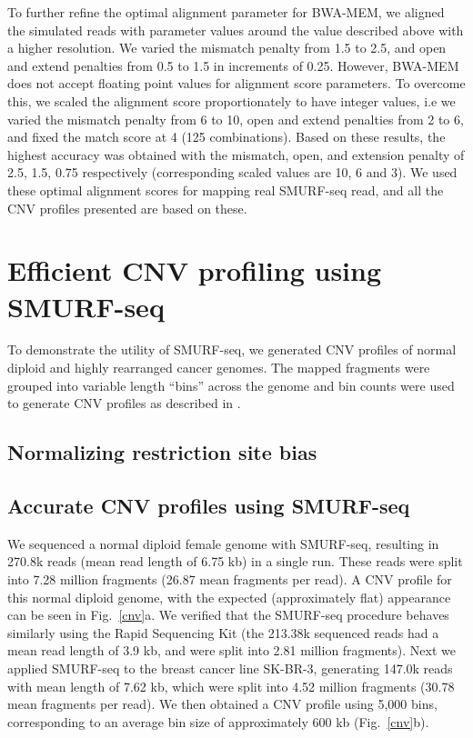 To further refine the optimal alignment parameter for BWA-MEM, we
aligned the simulated reads with parameter values around the value
described above with a higher resolution. We varied the mismatch penalty
from 1.5 to 2.5, and open and extend penalties from 0.5 to 1.5 in
increments of 0.25.
%
However, BWA-MEM does not accept floating point values for alignment
score parameters. To overcome this, we scaled the alignment score
proportionately to have integer values, i.e we varied the mismatch
penalty from 6 to 10, open and extend penalties from 2 to 6, and fixed
the match score at 4 (125 combinations).
%
Based on these results, the highest accuracy was obtained with the
mismatch, open, and extension penalty of 2.5, 1.5, 0.75 respectively
(corresponding scaled values are 10, 6 and 3). We used these optimal
alignment scores for mapping real SMURF-seq read, and all the CNV
profiles presented are based on these.



\section{Efficient CNV profiling using SMURF-seq}
To demonstrate the utility of SMURF-seq, we generated CNV profiles of
normal diploid and highly rearranged cancer genomes.  The mapped
fragments were grouped into variable length ``bins'' across the genome
and bin counts were used to generate CNV profiles as described in
\cite{baslan2012genome,kendall2014computational}.

\subsection{Normalizing restriction site bias}

\subsection{Accurate CNV profiles using SMURF-seq}
We sequenced a normal diploid female genome with SMURF-seq, resulting in
270.8k reads (mean read length of 6.75 kb) in a single run. These reads
were split into 7.28 million fragments (26.87 mean fragments per read).
A CNV profile for this normal diploid genome, with the expected
(approximately flat) appearance can be seen in Fig.~\ref{cnv}a.  We
verified that the SMURF-seq procedure behaves similarly using the Rapid
Sequencing Kit (the 213.38k sequenced reads had a mean read length of
3.9 kb, and were split into 2.81 million fragments).  Next we applied
SMURF-seq to the breast cancer line SK-BR-3, generating 147.0k reads
with mean length of 7.62 kb, which were split into 4.52 million
fragments (30.78 mean fragments per read). We then obtained a CNV
profile using 5,000 bins, corresponding to an average bin size of
approximately 600 kb (Fig.~\ref{cnv}b).

